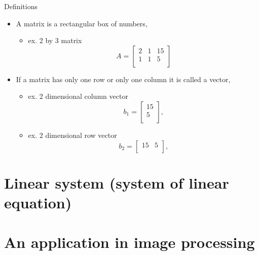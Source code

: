 \documentclass{beamer}
\theoremstyle{definition}
\theoremstyle{theorem}
\begin{document}
\begin{frame}
{Definitions}
\begin{itemize}
 \item A matrix is a rectangular box of numbers,
 \begin{itemize}
 \item ex. 2 by 3 matrix 
 $$ A = 
\begin{bmatrix}
 2 & 1 & 15\\
 1 & 1 & 5\\
 \end{bmatrix}
$$
\end{itemize}
\item If a matrix has only one row or only one column it is called a vector, 
\begin{itemize}
 \item ex. 2 dimensional column vector 
 $$ b_{1} = 
\begin{bmatrix}
 15 \\
 5  \\
 \end{bmatrix}, 
 $$
\item ex. 2 dimensional  row vector
 $$  b_{2} = 
 \begin{bmatrix}
 15 &
 5  \\
 \end{bmatrix}, 
 $$
\end{itemize} 
\end{itemize}
\end{frame}

\section{Linear system (system of linear equation)}

\section{An  application in image processing}
\end{document}
